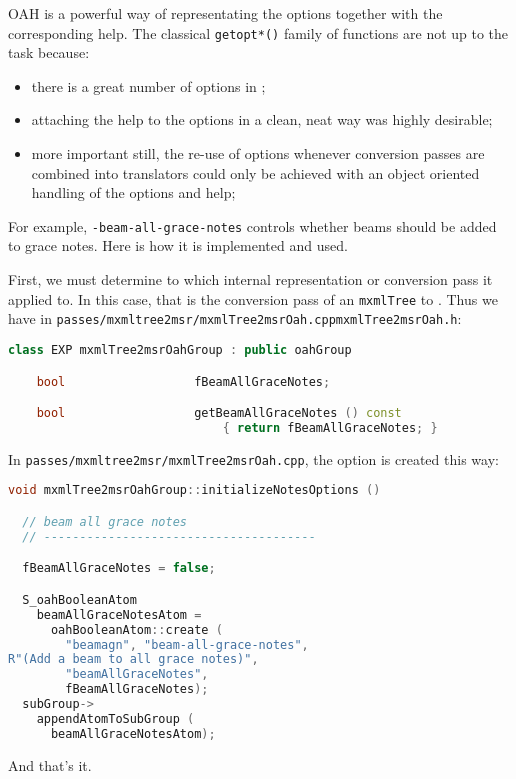 OAH is a powerful way of representating the options together with the corresponding help. The classical {\tt getopt*()} family of functions are not up to the task because:
\begin{itemize}
\item there is a great number of options in \formats;
\item attaching the help to the options in a clean, neat way was highly desirable;
\item more important still, the re-use of options whenever conversion passes are combined into translators could only be achieved with an object oriented handling of the options and help;
\end{itemize}

For example, {\tt -beam-all-grace-notes} controls whether beams should be added to grace notes. Here is how it is implemented and used.

First, we must determine to which internal representation or conversion pass it applied to. In this case, that is the conversion pass of an {\tt mxmlTree} to \msr.
Thus we have in {\tt passes/mxmltree2msr/mxmlTree2msrOah.cppmxmlTree2msrOah.h}:
\begin{lstlisting}[language=C++]
class EXP mxmlTree2msrOahGroup : public oahGroup

    bool                  fBeamAllGraceNotes;

    bool                  getBeamAllGraceNotes () const
                              { return fBeamAllGraceNotes; }
\end{lstlisting}

In {\tt passes/mxmltree2msr/mxmlTree2msrOah.cpp}, the option is created this way:
\begin{lstlisting}[language=C++]
void mxmlTree2msrOahGroup::initializeNotesOptions ()

  // beam all grace notes
  // --------------------------------------

  fBeamAllGraceNotes = false;

  S_oahBooleanAtom
    beamAllGraceNotesAtom =
      oahBooleanAtom::create (
        "beamagn", "beam-all-grace-notes",
R"(Add a beam to all grace notes)",
        "beamAllGraceNotes",
        fBeamAllGraceNotes);
  subGroup->
    appendAtomToSubGroup (
      beamAllGraceNotesAtom);
\end{lstlisting}

And that's it. 

